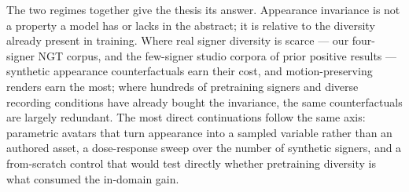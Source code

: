 The two regimes together give the thesis its answer. Appearance
invariance is not a property a model has or lacks in the abstract; it is
relative to the diversity already present in training. Where real signer
diversity is scarce --- our four-signer NGT corpus, and the
few-signer studio corpora of prior positive results --- synthetic
appearance counterfactuals earn their cost, and motion-preserving
renders earn the most; where hundreds of pretraining signers and diverse
recording conditions have already bought the invariance, the same
counterfactuals are largely redundant.
The most direct continuations follow the same axis: parametric avatars
that turn appearance into a sampled variable rather than an authored
asset, a dose-response sweep over the number of synthetic signers, and a
from-scratch control that would test directly whether pretraining
diversity is what consumed the in-domain gain.

